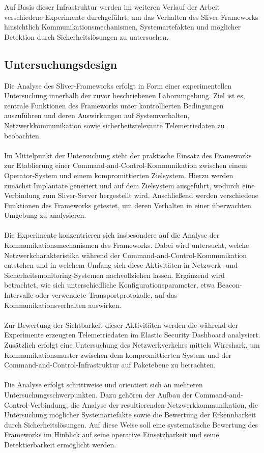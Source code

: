 Auf Basis dieser Infrastruktur werden im weiteren Verlauf der Arbeit verschiedene Experimente durchgeführt, um das Verhalten des Sliver-Frameworks hinsichtlich Kommunikationsmechanismen, Systemartefakten und möglicher Detektion durch Sicherheitslösungen zu untersuchen.
\subsection{Untersuchungsdesign}
Die Analyse des Sliver-Frameworks erfolgt in Form einer experimentellen Untersuchung innerhalb der zuvor beschriebenen Laborumgebung. Ziel ist es, zentrale Funktionen des Frameworks unter kontrollierten Bedingungen auszuführen und deren Auswirkungen auf Systemverhalten, Netzwerkkommunikation sowie sicherheitsrelevante Telemetriedaten zu beobachten.
\\\\
Im Mittelpunkt der Untersuchung steht der praktische Einsatz des Frameworks zur Etablierung einer Command-and-Control-Kommunikation zwischen einem Operator-System und einem kompromittierten Zielsystem. Hierzu werden zunächst Implantate generiert und auf dem Zielsystem ausgeführt, wodurch eine Verbindung zum Sliver-Server hergestellt wird. Anschließend werden verschiedene Funktionen des Frameworks getestet, um deren Verhalten in einer überwachten Umgebung zu analysieren.
\\\\
Die Experimente konzentrieren sich insbesondere auf die Analyse der Kommunikationsmechanismen des Frameworks. Dabei wird untersucht, welche Netzwerkcharakteristika während der Command-and-Control-Kommunikation entstehen und in welchem Umfang sich diese Aktivitäten in Netzwerk- und Sicherheitsmonitoring-Systemen nachvollziehen lassen. Ergänzend wird betrachtet, wie sich unterschiedliche Konfigurationsparameter, etwa Beacon-Intervalle oder verwendete Transportprotokolle, auf das Kommunikationsverhalten auswirken.
\\\\
Zur Bewertung der Sichtbarkeit dieser Aktivitäten werden die während der Experimente erzeugten Telemetriedaten im Elastic Security Dashboard analysiert. Zusätzlich erfolgt eine Untersuchung des Netzwerkverkehrs mittels Wireshark, um Kommunikationsmuster zwischen dem kompromittierten System und der Command-and-Control-Infrastruktur auf Paketebene zu betrachten.
\\\\
Die Analyse erfolgt schrittweise und orientiert sich an mehreren Untersuchungsschwerpunkten. Dazu gehören der Aufbau der Command-and-Control-Verbindung, die Analyse der resultierenden Netzwerkkommunikation, die Untersuchung möglicher Systemartefakte sowie die Bewertung der Erkennbarkeit durch Sicherheitslösungen. Auf diese Weise soll eine systematische Bewertung des Frameworks im Hinblick auf seine operative Einsetzbarkeit und seine Detektierbarkeit ermöglicht werden.
